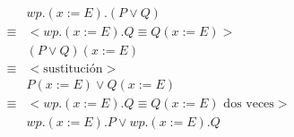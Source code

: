 \documentclass{article}
\begin{document}
\begin{align*}
 & wp.(x := E).(P \vee Q) \\
 \equiv & <wp.(x := E).Q \equiv Q(x := E)> \\
 & (P \vee Q)(x := E) \\
 \equiv & <\text{sustitución}> \\
 & P(x := E) \vee Q(x := E) \\
 \equiv & <wp.(x := E).Q \equiv Q(x := E) \text{ dos veces}> \\
 & wp.(x := E).P \vee wp.(x := E).Q \\
\end{align*}

\section{}
\end{document}
